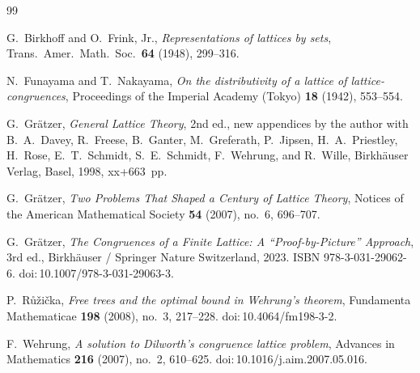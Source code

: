 ﻿\documentclass{article}
\begin{document}
\begin{thebibliography}{99}

G.~Birkhoff and O.~Frink, Jr.,
\textit{Representations of lattices by sets},
Trans.\ Amer.\ Math.\ Soc.\ \textbf{64} (1948), 299--316.

N.~Funayama and T.~Nakayama,
\textit{On the distributivity of a lattice of lattice-congruences},
Proceedings of the Imperial Academy (Tokyo) \textbf{18} (1942), 553--554.

G.~Gr\"atzer,
\textit{General Lattice Theory},
2nd ed., new appendices by the author with B.~A.~Davey, R.~Freese, B.~Ganter,
M.~Greferath, P.~Jipsen, H.~A.~Priestley, H.~Rose, E.~T.~Schmidt, S.~E.~Schmidt,
F.~Wehrung, and R.~Wille,
Birkh\"auser Verlag, Basel, 1998, xx+663~pp.

G.~Gr\"atzer,
\textit{Two Problems That Shaped a Century of Lattice Theory},
Notices of the American Mathematical Society \textbf{54} (2007), no.~6, 696--707.

G.~Gr\"atzer,
\textit{The Congruences of a Finite Lattice: A ``Proof-by-Picture'' Approach},
3rd ed., Birkh\"auser / Springer Nature Switzerland, 2023.
ISBN 978-3-031-29062-6.
doi:\,10.1007/978-3-031-29063-3.

P.~R{\r u}{\v z}i{\v c}ka,
\textit{Free trees and the optimal bound in Wehrung's theorem},
Fundamenta Mathematicae \textbf{198} (2008), no.~3, 217--228.
doi:\,10.4064/fm198-3-2.

F.~Wehrung,
\textit{A solution to Dilworth's congruence lattice problem},
Advances in Mathematics \textbf{216} (2007), no.~2, 610--625.
doi:\,10.1016/j.aim.2007.05.016.

\end{thebibliography}
\end{document}
